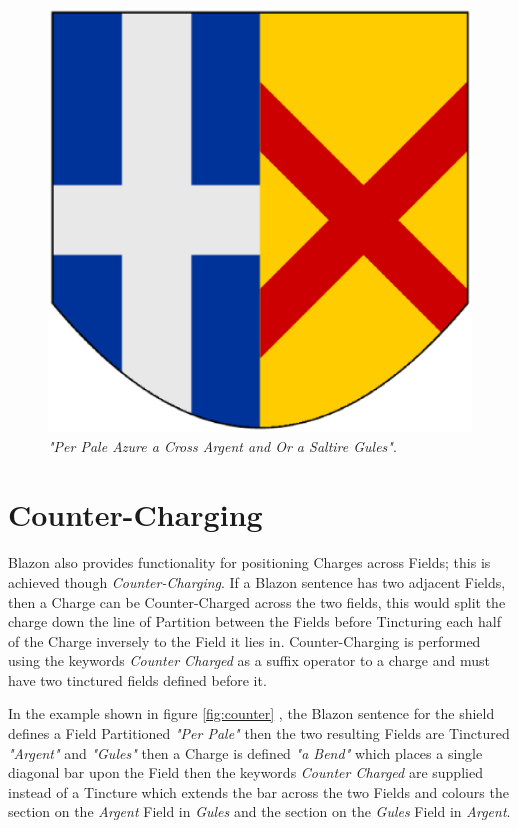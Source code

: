 
\begin{figure}[H]
  \centering
    \includegraphics[width=\textwidth]{blazon/images/perpaleazureacrossargent.eps}
  \caption{\emph{"Per Pale Azure a Cross Argent and Or a Saltire Gules"}.}
  
\end{figure}

\section{Counter-Charging}

Blazon also provides functionality for positioning Charges across Fields; this is achieved though \emph{Counter-Charging}.  If a Blazon sentence has two adjacent Fields, then a Charge can be Counter-Charged across the two fields, this would split the charge down the line of Partition between the Fields before Tincturing each half of the Charge inversely to the Field it lies in.  Counter-Charging is performed using the keywords \emph{Counter Charged} as a suffix operator to a charge and must have two tinctured fields defined before it. 

In the example shown in figure \ref{fig:counter}
, the Blazon sentence for the shield defines a Field Partitioned \emph{"Per Pale"} then the two resulting Fields are Tinctured \emph{"Argent"} and \emph{"Gules"} then a Charge is defined \emph{"a Bend"} which places a single diagonal bar upon the Field then the keywords \emph{Counter Charged} are supplied instead of a Tincture which extends the bar across the two Fields and colours the section on the \emph{Argent} Field in \emph{Gules} and the section on the \emph{Gules} Field in \emph{Argent}.


